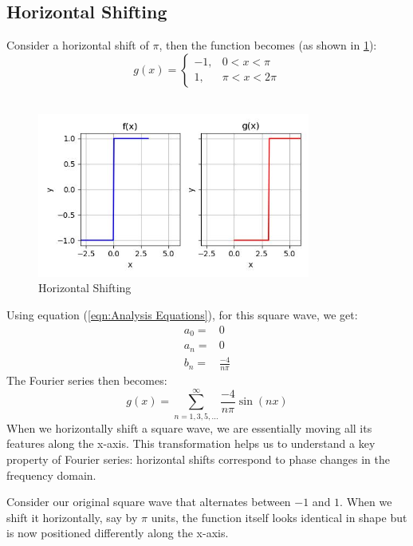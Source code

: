 \documentclass{article}
\begin{document}
\subsection{Horizontal Shifting}
Consider a horizontal shift of $\pi$, then the function becomes (as shown in \ref{fig: horizontal shift}):
\begin{equation}
g(x) = 
\begin{cases} 
-1, & 0 < x < \pi \\
1, & \pi < x < 2\pi
\end{cases}
\end{equation}\\
\begin{figure}
    \centering
    \includegraphics[width=0.8\textwidth]{horizontal_shift.jpg}
    \caption{Horizontal Shifting}
    \label{fig: horizontal shift}
\end{figure}
Using equation (\ref{eqn:Analysis Equations}), for this square wave, we get:
    \begin{eqnarray}
    a_0 =& 0\nonumber\\
    a_n =& 0\\
    b_n =& \frac{-4}{n\pi}\nonumber
    \end{eqnarray}  
The Fourier series then becomes:
\begin{equation}
g(x) = \sum_{n=1,3,5,...}^{\infty} \frac{-4}{n\pi} \sin\left(nx\right)
\end{equation}
When we horizontally shift a square wave, we are essentially moving all its features along the x-axis. This transformation helps us to understand a key property of Fourier series: horizontal shifts correspond to phase changes in the frequency domain.
\vspace{0.2in}

Consider our original square wave that alternates between $-1$ and $1$. When we shift it horizontally, say by $\pi$ units, the function itself looks identical in shape but is now positioned differently along the x-axis.
\vspace{0.2in}
\end{document}
